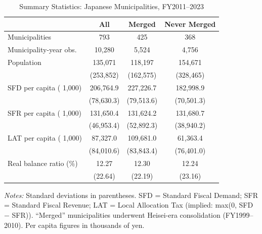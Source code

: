 \begin{table}[htbp]
\centering
\caption{Summary Statistics: Japanese Municipalities, FY2011--2023}
\label{tab:sumstats}
\begin{tabular}{lccc}
\hline\hline
 & All & Merged & Never Merged \\
\hline
Municipalities & 793 & 425 & 368 \\
Municipality-year obs. & 10,280 & 5,524 & 4,756 \\
\addlinespace
Population & 135,071 & 118,197 & 154,671 \\
 & (253,852) & (162,575) & (328,465) \\
\addlinespace
SFD per capita (\textyen{} 1,000) & 206,764.9 & 227,226.7 & 182,998.9 \\
 & (78,630.3) & (79,513.6) & (70,501.3) \\
\addlinespace
SFR per capita (\textyen{} 1,000) & 131,650.4 & 131,624.2 & 131,680.7 \\
 & (46,953.4) & (52,892.3) & (38,940.2) \\
\addlinespace
LAT per capita (\textyen{} 1,000) & 87,327.0 & 109,681.0 & 61,363.4 \\
 & (84,010.6) & (83,843.4) & (76,401.0) \\
\addlinespace
Real balance ratio (\%) & 12.27 & 12.30 & 12.24 \\
 & (22.64) & (22.19) & (23.16) \\
\hline\hline
\end{tabular}
\begin{tablenotes}
\item \textit{Notes:} Standard deviations in parentheses. SFD = Standard Fiscal Demand; SFR = Standard Fiscal Revenue; LAT = Local Allocation Tax (implied: max(0, SFD $-$ SFR)). ``Merged'' municipalities underwent Heisei-era consolidation (FY1999--2010). Per capita figures in thousands of yen.
\end{tablenotes}
\end{table}

